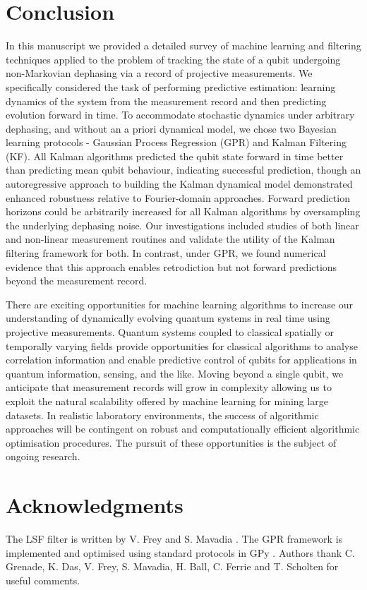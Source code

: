 \section{Conclusion \label{sec:main:Conclusion}}

In this manuscript we provided a detailed survey of machine learning and filtering techniques applied to the problem of tracking the state of a qubit undergoing non-Markovian dephasing via a record of projective measurements.  We specifically considered the task of performing predictive estimation: learning dynamics of the system from the measurement record and then predicting evolution forward in time. To accommodate stochastic dynamics under arbitrary dephasing, and without an a priori dynamical model, we chose two Bayesian learning protocols - Gaussian Process Regression (GPR) and Kalman Filtering (KF).  All Kalman algorithms predicted the qubit state forward in time better than predicting mean qubit behaviour, indicating successful prediction, though an autoregressive approach to building the Kalman dynamical model demonstrated enhanced robustness relative to Fourier-domain approaches.  Forward prediction horizons could be arbitrarily increased for all Kalman algorithms by oversampling the underlying dephasing noise.  Our investigations included studies of both linear and non-linear measurement routines and validate the utility of the Kalman filtering framework for both.  In contrast, under GPR, we found numerical evidence that this approach enables retrodiction but not forward predictions beyond the measurement record.  

There are exciting opportunities for machine learning algorithms to increase our understanding of dynamically evolving quantum systems in real time using projective measurements. Quantum systems coupled to classical spatially or temporally varying fields provide opportunities for classical algorithms to analyse correlation information and enable predictive control of qubits for applications in quantum information, sensing, and the like. Moving beyond a single qubit, we anticipate that measurement records will grow in complexity allowing us to exploit the natural scalability offered by machine learning for mining large datasets. In realistic laboratory environments, the success of algorithmic approaches will be contingent on robust and computationally efficient algorithmic optimisation procedures. The pursuit of these opportunities is the subject of ongoing research.


\section{Acknowledgments}
 The LSF filter is written by V. Frey and S. Mavadia \cite{mavadia2017}. The GPR framework is implemented and optimised using standard protocols in GPy \cite{gpy2014}. Authors thank C. Grenade, K. Das, V. Frey, S. Mavadia, H. Ball, C. Ferrie and T. Scholten for useful comments. 
 
